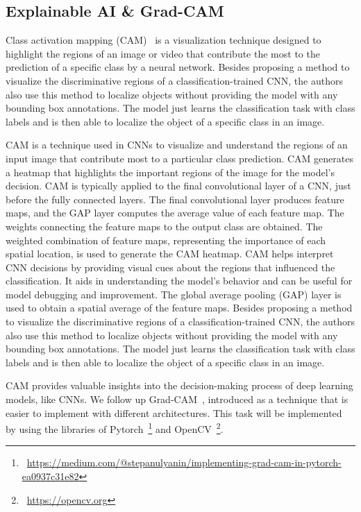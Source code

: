 \subsection{Explainable AI \& Grad-CAM} %
\label{sec:optim:cam}

Class activation mapping (CAM)~\cite{ZhouKLOT16} is a visualization technique designed to highlight the regions of an image or video that contribute the most to the prediction of a specific class by a neural network. 
Besides proposing a method to visualize the discriminative regions of a classification-trained CNN, the authors also use this method to localize objects without providing the model with any bounding box annotations. 
The model just learns the classification task with class labels and is then able to localize the object of a specific class in an image. 

CAM is a technique used in CNNs to visualize and understand the regions of an input image that contribute most to a particular class prediction. 
CAM generates a heatmap that highlights the important regions of the image for the model's decision.
CAM is typically applied to the final convolutional layer of a CNN, just before the fully connected layers.
The final convolutional layer produces feature maps, and the GAP layer computes the average value of each feature map.
The weights connecting the feature maps to the output class are obtained.
The weighted combination of feature maps, representing the importance of each spatial location, is used to generate the CAM heatmap.
CAM helps interpret CNN decisions by providing visual cues about the regions that influenced the classification.
It aids in understanding the model's behavior and can be useful for model debugging and improvement.
The global average pooling (GAP) layer is used to obtain a spatial average of the feature maps. 
Besides proposing a method to visualize the discriminative regions of a classification-trained CNN, the authors also use this method to localize objects without providing the model with any bounding box annotations. %
The model just learns the classification task with class labels and is then able to localize the object of a specific class in an image. 

CAM provides valuable insights into the decision-making process of deep learning models, like CNNs.
We follow up Grad-CAM~\cite{almeida_grad-cam_2023}, introduced as a technique that is easier to implement with different architectures.
This task will be implemented by using the libraries of Pytorch~\footnote{~\url{https://medium.com/@stepanulyanin/implementing-grad-cam-in-pytorch-ea0937c31e82}}
and OpenCV~\footnote{~\url{https://opencv.org}}.

